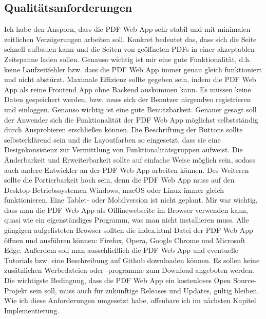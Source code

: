 \subsection{Qualitätsanforderungen}
Ich habe den Ansporn, dass die PDF Web App sehr stabil und mit minimalen zeitlichen Verzögerungen arbeiten soll. Konkret bedeutet das, dass sich die Seite schnell aufbauen kann und die Seiten von geöffneten PDFs in einer akzeptablen Zeitspanne laden sollen. Genauso wichtig ist mir eine gute Funktionalität, d.h. keine Laufzeitfehler bzw. dass die PDF Web App immer genau gleich funktioniert und nicht abstürzt. Maximale Effizienz sollte gegeben sein, indem die PDF Web App als reine Frontend App ohne Backend auskommen kann. Es müssen keine Daten gespeichert werden, bzw. muss sich der Benutzer nirgendwo registrieren und einloggen. Genauso wichtig ist eine gute Benutzbarkeit. Genauer gesagt soll der Anwender sich die Funktionalität der PDF Web App möglichst selbstständig durch Ausprobieren erschließen können. Die Beschriftung der Buttons sollte selbsterklärend sein und die Layoutfarben so eingesetzt, dass sie eine Designkonsistenz zur Vermittlung von Funktionalitätsgruppen aufweist. Die Änderbarkeit und Erweiterbarkeit sollte auf einfache Weise möglich sein, sodass auch andere Entwickler an der PDF Web App arbeiten können. Des Weiteren sollte die Portierbarkeit hoch sein, denn die PDF Web App muss auf den Desktop-Betriebssystemen Windows, macOS oder Linux immer gleich funktionieren. Eine Tablet- oder Mobilversion ist nicht geplant. Mir war wichtig, dass man die PDF Web App als Offlinewebseite im Browser verwenden kann, quasi wie ein eigenständiges Programm, was man nicht installieren muss. Alle gängigen aufgelisteten Browser sollten die index.html-Datei der PDF Web App öffnen und ausführen können: Firefox, Opera, Google Chrome und Microsoft Edge. Außerdem soll man ausschließlich die PDF Web App und eventuelle Tutorials bzw. eine Beschreibung auf Github downloaden können. Es sollen keine zusätzlichen Werbedateien oder -programme zum Download angeboten werden. Die wichtigste Bedingung, dass die PDF Web App ein kostenloses Open Source-Projekt sein soll, muss auch für zukünftige Releases und Updates, gültig bleiben. Wie ich diese Anforderungen umgesetzt habe, offenbare ich im nächsten Kapitel Implementierung.
